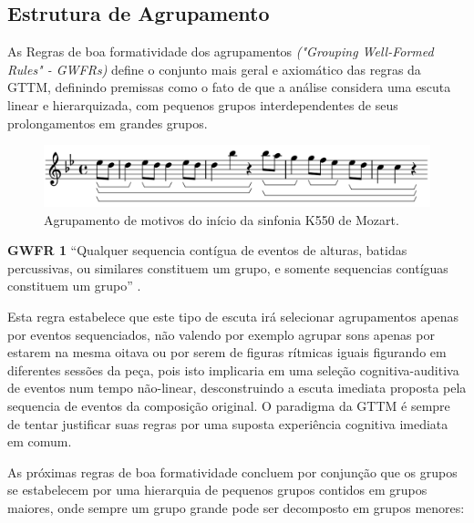\documentclass[
	12pt,				%
	openright,			%
	twoside,			%
	a4paper,			%
	english,			%
	french,				%
	spanish,			%
	brazil				%
	]{abntex2}
\begin{document}
\pagebreak
\subsection{Estrutura de Agrupamento}

As Regras de boa formatividade dos agrupamentos \textit{("Grouping Well-Formed Rules" - GWFRs) }define o conjunto mais geral e axiomático das regras da GTTM, definindo premissas como o fato de que a análise considera uma escuta linear e hierarquizada, com pequenos grupos interdependentes de seus prolongamentos em grandes grupos.

\begin{figure}[htb]
	\caption{\label{fig_grafico}Agrupamento de motivos do início da sinfonia K550 de Mozart.}
	\begin{center}
	    \includegraphics[scale=0.45]{gttm/lilypondGROUPmozartGTTM.png}
	\end{center}
\end{figure}

\begin{citacao}
\textbf{GWFR 1} “Qualquer sequencia contígua de eventos de alturas, batidas percussivas, ou similares constituem um grupo, e somente sequencias contíguas constituem um grupo” \cite[ pg.37]{lerdahl1983generative}.
\end{citacao}

Esta regra estabelece que este tipo de escuta irá selecionar agrupamentos apenas por eventos sequenciados, não valendo por exemplo agrupar sons apenas por estarem na mesma oitava ou por serem de figuras rítmicas iguais figurando em diferentes sessões da peça, pois isto implicaria em uma seleção cognitiva-auditiva de eventos num tempo não-linear, desconstruindo a escuta imediata proposta pela sequencia de eventos da composição original. O paradigma da GTTM é sempre de tentar justificar suas regras por uma suposta experiência cognitiva imediata em comum.

As próximas regras de boa formatividade concluem por conjunção que os grupos se estabelecem por uma hierarquia de pequenos grupos contidos em grupos maiores, onde sempre um grupo grande pode ser decomposto em grupos menores:
\end{document}
